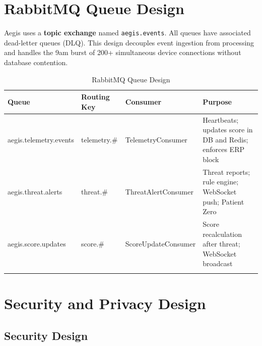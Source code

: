 \documentclass[12pt,a4paper]{report}
\begin{document}
\chapter{RabbitMQ Queue Design}

Aegis uses a \textbf{topic exchange} named \texttt{aegis.events}. All queues have associated dead-letter queues (DLQ). This design decouples event ingestion from processing and handles the 9am burst of 200+ simultaneous device connections without database contention.

\begin{longtable}{@{}p{4.5cm}p{2.5cm}p{3cm}p{4cm}@{}}
  \toprule
  \textbf{Queue} & \textbf{Routing Key} & \textbf{Consumer} & \textbf{Purpose} \\
  \midrule
  \endhead
  aegis.telemetry.events & telemetry.\# & TelemetryConsumer    & Heartbeats; updates score in DB and Redis; enforces ERP block \\
  aegis.threat.alerts    & threat.\#    & ThreatAlertConsumer  & Threat reports; rule engine; WebSocket push; Patient Zero \\
  aegis.score.updates    & score.\#     & ScoreUpdateConsumer  & Score recalculation after threat; WebSocket broadcast \\
  \bottomrule
  \caption{RabbitMQ Queue Design}
\end{longtable}

\chapter{Security and Privacy Design}

\section{Security Design}
\end{document}
